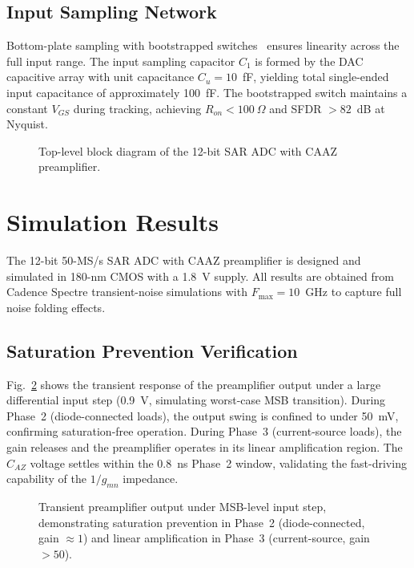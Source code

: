 \documentclass[journal]{IEEEtran}
\begin{document}
\subsection{Input Sampling Network}

Bottom-plate sampling with bootstrapped switches~\cite{razavi2017principles} ensures linearity across the full input range. The input sampling capacitor $C_1$ is formed by the DAC capacitive array with unit capacitance $C_u = 10$~fF, yielding total single-ended input capacitance of approximately 100~fF. The bootstrapped switch maintains a constant $V_{GS}$ during tracking, achieving $R_{on} < 100~\Omega$ and SFDR $> 82$~dB at Nyquist.

\begin{figure}[!t]
\centering
{}
\caption{Top-level block diagram of the 12-bit SAR ADC with CAAZ preamplifier.}
\label{fig:block_diagram}
\end{figure}

\section{Simulation Results}
\label{sec:results}

The 12-bit 50-MS/s SAR ADC with CAAZ preamplifier is designed and simulated in 180-nm CMOS with a 1.8~V supply. All results are obtained from Cadence Spectre transient-noise simulations with $F_{\text{max}} = 10$~GHz to capture full noise folding effects.

\subsection{Saturation Prevention Verification}

Fig.~\ref{fig:transient} shows the transient response of the preamplifier output under a large differential input step (0.9~V, simulating worst-case MSB transition). During Phase~2 (diode-connected loads), the output swing is confined to under 50~mV, confirming saturation-free operation. During Phase~3 (current-source loads), the gain releases and the preamplifier operates in its linear amplification region. The $C_{AZ}$ voltage settles within the 0.8~ns Phase~2 window, validating the fast-driving capability of the $1/g_{mn}$ impedance.

\begin{figure}[!t]
\centering
{}
\caption{Transient preamplifier output under MSB-level input step, demonstrating saturation prevention in Phase~2 (diode-connected, gain $\approx 1$) and linear amplification in Phase~3 (current-source, gain $>50$).}
\label{fig:transient}
\end{figure}
\end{document}
